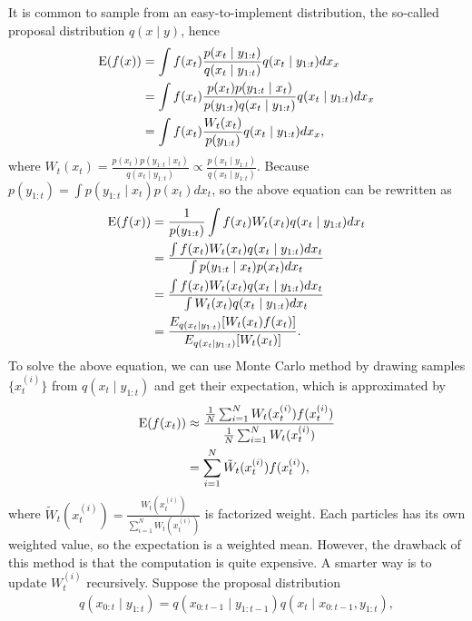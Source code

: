 It is common to sample from an easy-to-implement distribution, the so-called proposal distribution $q(x\mid y)$, hence
\begin{align*}
\mathrm{E}(f(x)) &= \int f(x_t )\frac{p(x_t \mid y_{1:t})}{q(x_t \mid y_{1:t})} q(x_t \mid y_{1:t})dx_x\\
&= \int f(x_t )\frac{p(x_t )p(y_{1:t}\mid x_t )}{p(y_{1:t})q(x_t \mid y_{1:t})} q(x_t \mid y_{1:t})dx_x\\
&= \int f(x_t )\frac{W_t (x_t )}{p(y_{1:t})} q(x_t \mid y_{1:t})dx_x,
\end{align*}
where $W_t (x_t )=\frac{p(x_t )p(y_{1:t}\mid x_t )}{q(x_t \mid y_{1:t})} \propto \frac{p(x_t \mid y_{1:t})}{q(x_t \mid y_{1:t})}$. Because $p(y_{1:t})=\int p(y_{1:t}\mid x_t )p(x_t )dx_t $, so the above equation can be rewritten as
\begin{align*}
\mathrm{E}(f(x)) &= \frac{1}{p(y_{1:t})}\int f(x_t )W_t (x_t )q(x_t \mid y_{1:t})dx_t \\
&= \frac{ \int f(x_t )W_t (x_t )q(x_t \mid y_{1:t})dx_t  }{\int p(y_{1:t}\mid x_t )p(x_t )dx_t } \\
&= \frac{ \int f(x_t )W_t (x_t )q(x_t \mid y_{1:t})dx_t  }{\int W_t (x_t )q(x_t \mid y_{1:t})dx_t } \\
&= \frac{E_{q(x_t \mid y_{1:t})}[W_t (x_t )f(x_t )]}{E_{q(x_t \mid y_{1:t})}[W_t (x_t )]}.
\end{align*}
To solve the above equation, we can use Monte Carlo method by drawing samples $\{x_t ^{(i)}\}$ from $q(x_t \mid y_{1:t})$ and get their expectation, which is  approximated by 
\begin{align}\label{PFexpectation}
\begin{split}
\mathrm{E}(f(x_t )) &\approx \frac{\frac{1}{N} \sum_{i=1}^{N} W_t (x_t ^{(i)})f(x_t ^{(i)})} {\frac{1}{N} \sum_{i=1}^{N} W_t (x_t ^{(i)})}\\
&= \sum_{i=1}^{N} \tilde{W}_t (x_t ^{(i)})f(x_t ^{(i)}),
\end{split}
\end{align}
where $\tilde{W}_t (x_t ^{(i)}) = \frac{ W_t (x_t ^{(i)})}{\sum_{i=1}^NW_t (x_t ^{(i)})}$ is factorized weight. Each particles has its own weighted value, so the expectation is a weighted mean. However, the drawback of this method is that the computation is quite expensive. A smarter way is to update $W_t ^{(i)}$ recursively. Suppose the proposal distribution 
\begin{align*}
q(x_{0:t}\mid y_{1:t}) = q(x_{0:t-1}\mid y_{1:t-1}) q(x_t \mid  x_{0:t-1},y_{1:t}),
\end{align*}
